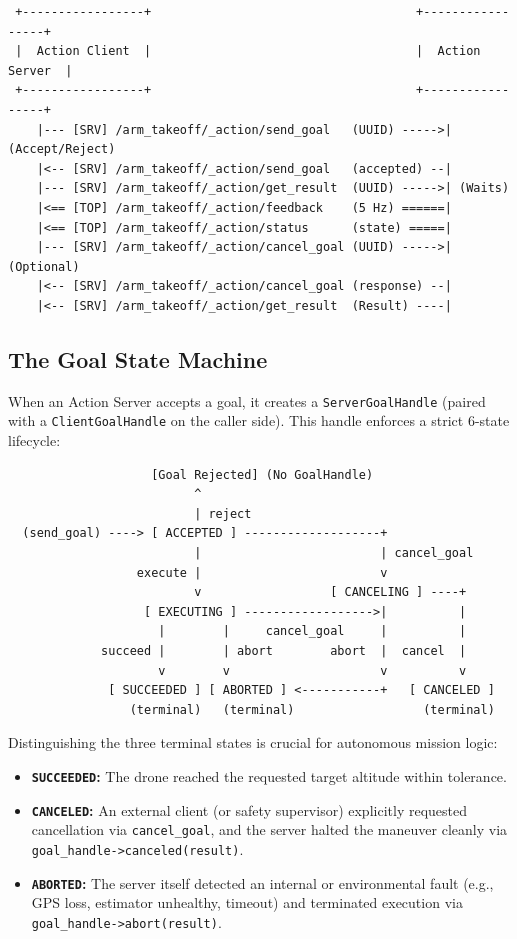 \documentclass{article}
\begin{document}
\begin{verbatim}
 +-----------------+                                     +-----------------+
 |  Action Client  |                                     |  Action Server  |
 +-----------------+                                     +-----------------+
    |--- [SRV] /arm_takeoff/_action/send_goal   (UUID) ----->| (Accept/Reject)
    |<-- [SRV] /arm_takeoff/_action/send_goal   (accepted) --|
    |--- [SRV] /arm_takeoff/_action/get_result  (UUID) ----->| (Waits)
    |<== [TOP] /arm_takeoff/_action/feedback    (5 Hz) ======|
    |<== [TOP] /arm_takeoff/_action/status      (state) =====|
    |--- [SRV] /arm_takeoff/_action/cancel_goal (UUID) ----->| (Optional)
    |<-- [SRV] /arm_takeoff/_action/cancel_goal (response) --|
    |<-- [SRV] /arm_takeoff/_action/get_result  (Result) ----|
\end{verbatim}

\subsection{The Goal State Machine}
When an Action Server accepts a goal, it creates a \texttt{ServerGoalHandle} (paired with a \texttt{ClientGoalHandle} on the caller side). This handle enforces a strict 6-state lifecycle:

\begin{verbatim}
                    [Goal Rejected] (No GoalHandle)
                          ^
                          | reject
  (send_goal) ----> [ ACCEPTED ] -------------------+
                          |                         | cancel_goal
                  execute |                         v
                          v                  [ CANCELING ] ----+
                   [ EXECUTING ] ------------------>|          |
                     |        |     cancel_goal     |          |
             succeed |        | abort        abort  |  cancel  |
                     v        v                     v          v
              [ SUCCEEDED ] [ ABORTED ] <-----------+   [ CANCELED ]
                 (terminal)   (terminal)                  (terminal)
\end{verbatim}

Distinguishing the three terminal states is crucial for autonomous mission logic:
\begin{itemize}
    \item \textbf{\texttt{SUCCEEDED}:} The drone reached the requested target altitude within tolerance.
    \item \textbf{\texttt{CANCELED}:} An external client (or safety supervisor) explicitly requested cancellation via \texttt{cancel\_goal}, and the server halted the maneuver cleanly via \texttt{goal\_handle->canceled(result)}.
    \item \textbf{\texttt{ABORTED}:} The server itself detected an internal or environmental fault (e.g., GPS loss, estimator unhealthy, timeout) and terminated execution via \texttt{goal\_handle->abort(result)}.
\end{itemize}
\end{document}
